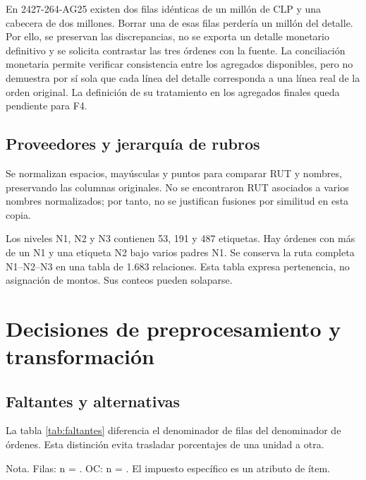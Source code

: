 \documentclass[12pt,letterpaper]{article}
\begin{document}
En 2427-264-AG25 existen dos filas idénticas de un millón de CLP y una cabecera de
dos millones. Borrar una de esas filas perdería un millón del detalle. Por ello,
se preservan las discrepancias, no se exporta un detalle monetario definitivo y se
solicita contrastar las tres órdenes con la fuente. La conciliación monetaria permite
verificar consistencia entre los agregados disponibles, pero no demuestra por sí sola
que cada línea del detalle corresponda a una línea real de la orden original.
La definición de su tratamiento en los agregados finales queda pendiente para F4.

\subsection{Proveedores y jerarquía de rubros}

Se normalizan espacios, mayúsculas y puntos para comparar RUT y nombres, preservando
las columnas originales. No se encontraron RUT asociados a varios nombres
normalizados; por tanto, no se justifican fusiones por similitud en esta copia.

Los niveles N1, N2 y N3 contienen 53, 191 y 487 etiquetas. Hay
\OrdenesMultirrubro{} órdenes con más de un N1 y una etiqueta N2 bajo varios padres N1.
Se conserva la ruta completa N1--N2--N3 en una tabla de 1.683 relaciones. Esta
tabla expresa pertenencia, no asignación de montos. Sus conteos pueden solaparse.

\section{Decisiones de preprocesamiento y transformación}

\subsection{Faltantes y alternativas}

La tabla \ref{tab:faltantes} diferencia el denominador de filas del denominador
de órdenes. Esta distinción evita trasladar porcentajes de una unidad a otra.

\begin{table}[H]
\caption{Ausencias en el original y en las cabeceras}
\label{tab:faltantes}
\small\singlespacing

\par\smallskip
{\footnotesize Nota. Filas: n = \FilasOriginal{}. OC: n = \Ordenes{}.
El impuesto específico es un atributo de ítem.}
\end{table}
\end{document}
